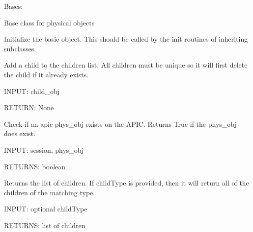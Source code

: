 \documentclass[letterpaper,10pt,english]{sphinxmanual}
\begin{document}
\begin{fulllineitems}
\label{aciphysobject:aciphysobject.BaseACIPhysObject}
Bases: {\hyperref[acibaseobject:acibaseobject.BaseACIObject]{}}

Base class for physical objects

Initialize the basic object.  This should be called by the
init routines of inheriting subclasses.

\begin{fulllineitems}
\label{aciphysobject:aciphysobject.BaseACIPhysObject.add_child}
Add a child to the children list. All children must be unique so it will
first delete the child if it already exists.

INPUT: child\_obj

RETURN: None

\end{fulllineitems}


\begin{fulllineitems}
\label{aciphysobject:aciphysobject.BaseACIPhysObject.exists}
Check if an apic phys\_obj exists on the APIC.
Returns True if the phys\_obj does exist.

INPUT: session, phys\_obj

RETURNS: boolean

\end{fulllineitems}


\begin{fulllineitems}
\label{aciphysobject:aciphysobject.BaseACIPhysObject.get_children}
Returns the list of children.  If childType is provided, then
it will return all of the children of the matching type.

INPUT: optional childType

RETURNS: list of children

\end{fulllineitems}


\end{fulllineitems}
\end{document}
